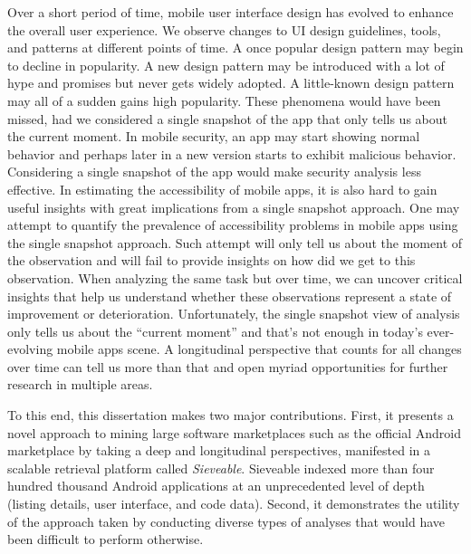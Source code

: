 Over a short period of time, mobile user interface design has evolved to enhance the overall user experience.
We observe changes to UI design guidelines, tools, and patterns at different points of time.
A once popular design pattern may begin to decline in popularity.
A new design pattern may be introduced with a lot of hype and promises but never gets widely adopted.
A little-known design pattern may all of a sudden gains high popularity.
These phenomena would have been missed, had we considered a single snapshot of the app that only tells us about the current moment.
In mobile security, an app may start showing normal behavior and perhaps later in a new version starts to exhibit malicious behavior.
Considering a single snapshot of the app would make security analysis less effective.
In estimating the accessibility of mobile apps, it is also hard to gain useful insights with great implications from a single snapshot approach.
One may attempt to quantify the prevalence of accessibility problems in mobile apps using the single snapshot approach.
Such attempt will only tell us about the moment of the observation and will fail to provide insights on how did we get to this observation.
When analyzing the same task but over time, we can uncover critical insights that help us understand whether these observations represent a state of improvement or deterioration.
Unfortunately, the single snapshot view of analysis only tells us about the ``current moment'' and that's not enough in today's ever-evolving mobile apps scene.
A longitudinal perspective that counts for all changes over time can tell us more than that and open myriad opportunities for further research in multiple areas.

To this end, this dissertation makes two major contributions.
First, it presents a novel approach to mining large software marketplaces such as the official Android marketplace by taking a deep and longitudinal perspectives, manifested in a scalable retrieval platform called \textit{Sieveable}.
Sieveable indexed more than four hundred thousand Android applications at an unprecedented level of depth (listing details, user interface, and code data).
Second, it demonstrates the utility of the approach taken by conducting diverse types of analyses that would have been difficult to perform otherwise.

